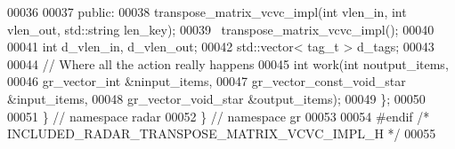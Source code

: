 \begin{DoxyCode}
00036 
00037      \textcolor{keyword}{public}:
00038       transpose_matrix_vcvc_impl(\textcolor{keywordtype}{int} vlen\_in, \textcolor{keywordtype}{int} vlen\_out, std::string len\_key);
00039       ~transpose_matrix_vcvc_impl();
00040       
00041       \textcolor{keywordtype}{int} d_vlen_in, d_vlen_out;
00042       std::vector< tag\_t > d_tags;
00043 
00044       \textcolor{comment}{// Where all the action really happens}
00045       \textcolor{keywordtype}{int} work(\textcolor{keywordtype}{int} noutput\_items,
00046                gr\_vector\_int &ninput\_items,
00047                gr\_vector\_const\_void\_star &input\_items,
00048                gr\_vector\_void\_star &output\_items);
00049     \};
00050 
00051   \} \textcolor{comment}{// namespace radar}
00052 \} \textcolor{comment}{// namespace gr}
00053 
00054 \textcolor{preprocessor}{#endif }\textcolor{comment}{/* INCLUDED\_RADAR\_TRANSPOSE\_MATRIX\_VCVC\_IMPL\_H */}\textcolor{preprocessor}{}
00055 
\end{DoxyCode}
